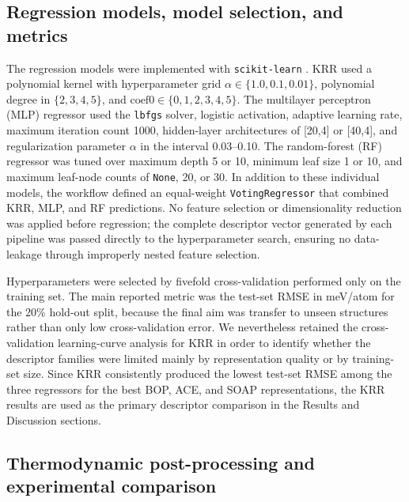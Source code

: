 \documentclass[prb,twocolumn,floatfix]{revtex4-2}
\begin{document}
\subsection{Regression models, model selection, and metrics}

The regression models were implemented with \texttt{scikit-learn} \cite{Pedregosa2011}. KRR used a polynomial kernel with hyperparameter grid $\alpha\in\{1.0,0.1,0.01\}$, polynomial degree in $\{2,3,4,5\}$, and $\mathrm{coef0}\in\{0,1,2,3,4,5\}$. The multilayer perceptron (MLP) regressor used the \texttt{lbfgs} solver, logistic activation, adaptive learning rate, maximum iteration count 1000, hidden-layer architectures of [20,4] or [40,4], and regularization parameter $\alpha$ in the interval 0.03--0.10. The random-forest (RF) regressor was tuned over maximum depth 5 or 10, minimum leaf size 1 or 10, and maximum leaf-node counts of \texttt{None}, 20, or 30. In addition to these individual models, the workflow defined an equal-weight \texttt{VotingRegressor} that combined KRR, MLP, and RF predictions. No feature selection or dimensionality reduction was applied before regression; the complete descriptor vector generated by each pipeline was passed directly to the hyperparameter search, ensuring no data-leakage through improperly nested feature selection.

Hyperparameters were selected by fivefold cross-validation performed only on the training set. The main reported metric was the test-set RMSE in meV/atom for the 20\% hold-out split, because the final aim was transfer to unseen structures rather than only low cross-validation error. We nevertheless retained the cross-validation learning-curve analysis for KRR in order to identify whether the descriptor families were limited mainly by representation quality or by training-set size. Since KRR consistently produced the lowest test-set RMSE among the three regressors for the best BOP, ACE, and SOAP representations, the KRR results are used as the primary descriptor comparison in the Results and Discussion sections.

\subsection{Thermodynamic post-processing and experimental comparison}
\end{document}
